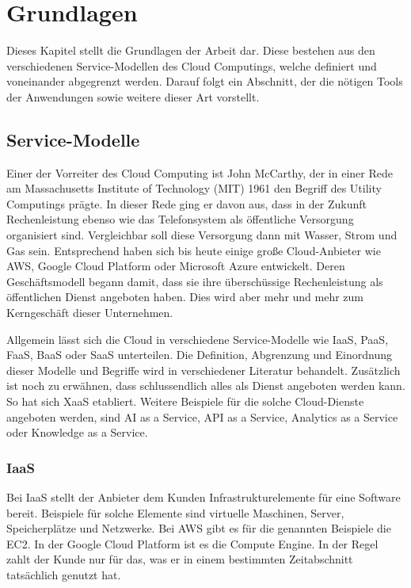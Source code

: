 \chapter{Grundlagen}

Dieses Kapitel stellt die Grundlagen der Arbeit dar. Diese bestehen aus den verschiedenen Service-Modellen des Cloud Computings, welche definiert und voneinander abgegrenzt werden. Darauf folgt ein Abschnitt, der die nötigen Tools der Anwendungen sowie weitere dieser Art vorstellt.

\section{Service-Modelle}

Einer der Vorreiter des Cloud Computing ist John McCarthy, der in einer Rede am Massachusetts Institute of Technology (MIT) 1961 den Begriff des Utility Computings prägte. In dieser Rede ging er davon aus, dass in der Zukunft Rechenleistung ebenso wie das Telefonsystem als öffentliche Versorgung organisiert sind. Vergleichbar soll diese Versorgung dann mit Wasser, Strom und Gas sein. Entsprechend haben sich bis heute einige große Cloud-Anbieter wie \ac{AWS}, Google Cloud Platform oder Microsoft Azure entwickelt. Deren Geschäftsmodell begann damit, dass sie ihre überschüssige Rechenleistung als öffentlichen Dienst angeboten haben. Dies wird aber mehr und mehr zum Kerngeschäft dieser Unternehmen. \autocite{buyya2013mastering}

Allgemein lässt sich die Cloud in verschiedene Service-Modelle wie \ac{IaaS}, \ac{PaaS}, \ac{FaaS}, \ac{BaaS} oder \ac{SaaS} unterteilen. Die Definition, Abgrenzung und Einordnung dieser Modelle und Begriffe wird in verschiedener Literatur \autocite{jiang2020overview}\autocite{kumar2019serverless}\autocite{dahunsi2021commercial} behandelt. Zusätzlich ist noch zu erwähnen, dass schlussendlich alles als Dienst angeboten werden kann. So hat sich \ac{XaaS} etabliert. Weitere Beispiele für die solche Cloud-Dienste angeboten werden, sind AI as a Service, API as a Service, Analytics as a Service oder Knowledge as a Service.

\subsection{\acl{IaaS}}

Bei \acf{IaaS} stellt der Anbieter dem Kunden Infrastrukturelemente für eine Software bereit. Beispiele für solche Elemente sind virtuelle Maschinen, Server, Speicherplätze und Netzwerke. Bei \ac{AWS} gibt es für die genannten Beispiele die \ac{EC2}. In der Google Cloud Platform ist es die Compute Engine. In der Regel zahlt der Kunde nur für das, was er in einem bestimmten Zeitabschnitt tatsächlich genutzt hat.

